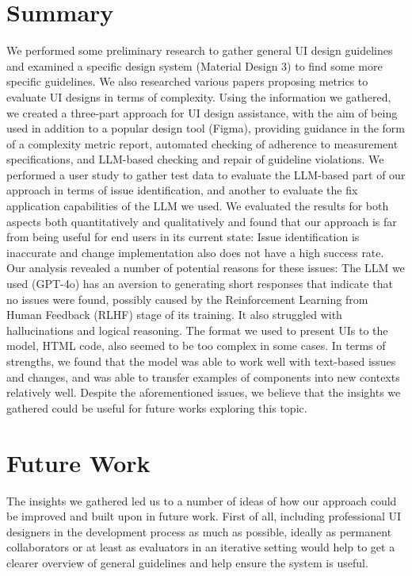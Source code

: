 \documentclass[11pt,titlepage,oneside,openany]{book}
\begin{document}
\section{Summary}
We performed some preliminary research to gather general UI design guidelines and examined a specific design system (Material Design 3) to find some more specific guidelines. We also researched various papers proposing metrics to evaluate UI designs in terms of complexity. Using the information we gathered, we created a three-part approach for UI design assistance, with the aim of being used in addition to a popular design tool (Figma), providing guidance in the form of a complexity metric report, automated checking of adherence to measurement specifications, and LLM-based checking and repair of guideline violations. We performed a user study to gather test data to evaluate the LLM-based part of our approach in terms of issue identification, and another to evaluate the fix application capabilities of the LLM we used. We evaluated the results for both aspects both quantitatively and qualitatively and found that our approach is far from being useful for end users in its current state: Issue identification is inaccurate and change implementation also does not have a high success rate. Our analysis revealed a number of potential reasons for these issues: The LLM we used (GPT-4o) has an aversion to generating short responses that indicate that no issues were found, possibly caused by the Reinforcement Learning from Human Feedback (RLHF) stage of its training. It also struggled with hallucinations and logical reasoning. The format we used to present UIs to the model, HTML code, also seemed to be too complex in some cases. In terms of strengths, we found that the model was able to work well with text-based issues and changes, and was able to transfer examples of components into new contexts relatively well. Despite the aforementioned issues, we believe that the insights we gathered could be useful for future works exploring this topic. 

\section{Future Work}

The insights we gathered led us to a number of ideas of how our approach could be improved and built upon in future work. First of all, including professional UI designers in the development process as much as possible, ideally as permanent collaborators or at least as evaluators in an iterative setting would help to get a clearer overview of general guidelines and help ensure the system is useful.
\end{document}
